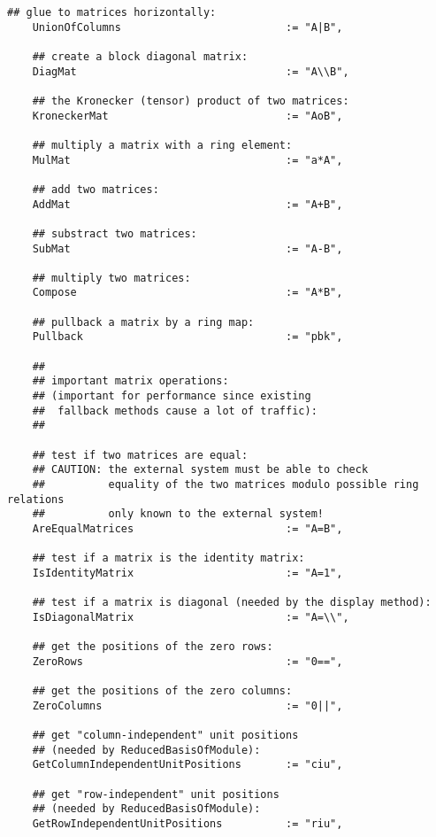 \documentclass[a4paper,11pt]{report}
\begin{document}
{{{\begin{Verbatim}[fontsize=\small,frame=single,label=Code]
    ## glue to matrices horizontally:
    UnionOfColumns                          := "A|B",
    
    ## create a block diagonal matrix:
    DiagMat                                 := "A\\B",
    
    ## the Kronecker (tensor) product of two matrices:
    KroneckerMat                            := "AoB",
    
    ## multiply a matrix with a ring element:
    MulMat                                  := "a*A",
    
    ## add two matrices:
    AddMat                                  := "A+B",
    
    ## substract two matrices:
    SubMat                                  := "A-B",
    
    ## multiply two matrices:
    Compose                                 := "A*B",
    
    ## pullback a matrix by a ring map:
    Pullback                                := "pbk",
    
    ##
    ## important matrix operations:
    ## (important for performance since existing
    ##  fallback methods cause a lot of traffic):
    ##
    
    ## test if two matrices are equal:
    ## CAUTION: the external system must be able to check
    ##          equality of the two matrices modulo possible ring relations
    ##          only known to the external system!
    AreEqualMatrices                        := "A=B",
    
    ## test if a matrix is the identity matrix:
    IsIdentityMatrix                        := "A=1",
    
    ## test if a matrix is diagonal (needed by the display method):
    IsDiagonalMatrix                        := "A=\\",
    
    ## get the positions of the zero rows:
    ZeroRows                                := "0==",
    
    ## get the positions of the zero columns:
    ZeroColumns                             := "0||",
    
    ## get "column-independent" unit positions
    ## (needed by ReducedBasisOfModule):
    GetColumnIndependentUnitPositions       := "ciu",
    
    ## get "row-independent" unit positions
    ## (needed by ReducedBasisOfModule):
    GetRowIndependentUnitPositions          := "riu",
    

\end{Verbatim}}}}
\end{document}
